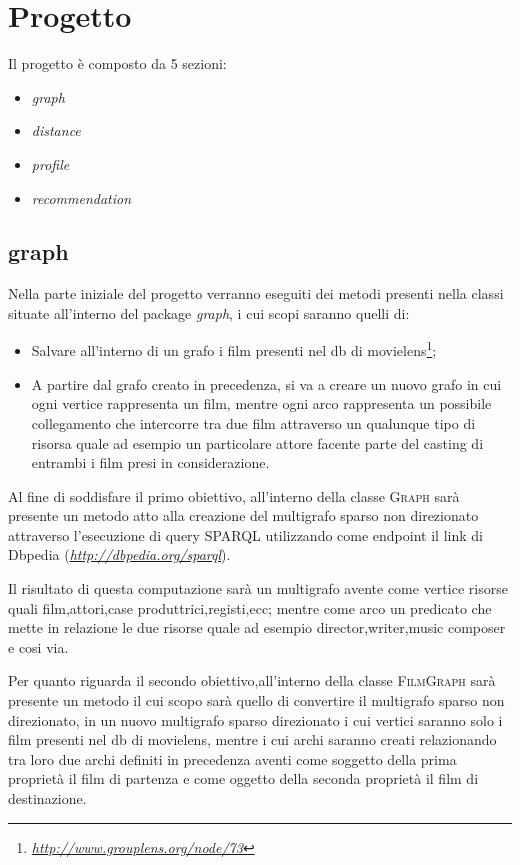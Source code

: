 \section{Progetto}
\label{project}

Il progetto è composto da 5 sezioni:
\begin{itemize}
\item\emph{graph}
\item\emph{distance}
\item\emph{profile}
\item\emph{recommendation}
\end{itemize}

\subsection{graph}
Nella parte iniziale del progetto verranno eseguiti dei metodi presenti nella classi situate all'interno del package \emph{graph}, i cui scopi saranno quelli di:
\begin{itemize}
\item Salvare all'interno di un grafo i film presenti nel db di movielens\footnote{\emph{\url{http://www.grouplens.org/node/73}}};
\item A partire dal grafo creato in precedenza, si va a creare un nuovo grafo in cui ogni vertice rappresenta un film, mentre ogni arco rappresenta un possibile collegamento che intercorre tra due film attraverso un qualunque tipo di risorsa quale ad esempio un particolare attore facente parte del casting di entrambi i film presi in considerazione.
\end{itemize}

Al fine di soddisfare il primo obiettivo, all'interno della classe \textsc{Graph} sarà presente un metodo atto alla creazione del multigrafo sparso non direzionato attraverso l'esecuzione di query SPARQL utilizzando come endpoint il link di Dbpedia (\emph{\footnotesize{\url{http://dbpedia.org/sparql}}}).

Il risultato di questa computazione sarà un multigrafo avente come vertice risorse quali film,attori,case produttrici,registi,ecc; mentre come arco un predicato che mette in relazione le due risorse quale ad esempio director,writer,music composer e cosi via.

Per quanto riguarda il secondo obiettivo,all'interno della classe \textsc{FilmGraph} sarà presente un metodo il cui scopo sarà quello di convertire il multigrafo sparso non direzionato, in un nuovo multigrafo sparso direzionato i cui vertici saranno solo i film presenti nel db di movielens, mentre i cui archi saranno creati relazionando tra loro due archi definiti in precedenza aventi come soggetto della prima proprietà il film di partenza e come oggetto della seconda proprietà il film di destinazione.

